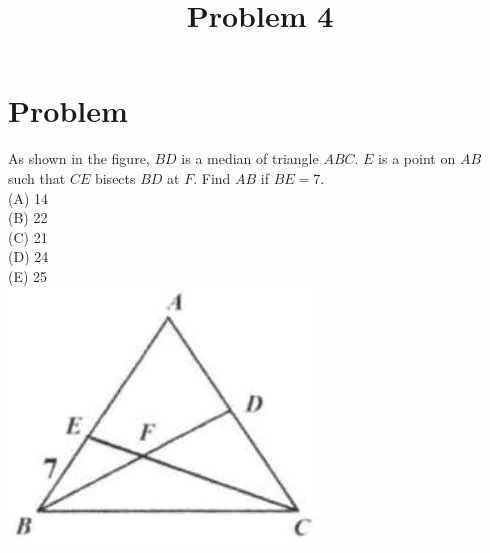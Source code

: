 \documentclass{article}
\title{Problem 4}
\date{}
\begin{document}
\maketitle

\section*{Problem}
As shown in the figure, \(B D\) is a median of triangle \(A B C\). \(E\) is a point on \(A B\) such that \(C E\) bisects \(B D\) at \(F\). Find \(A B\) if \(B E=7\).\\
(A) 14\\
(B) 22\\
(C) 21\\
(D) 24\\
(E) 25\\
\centering
\includegraphics[width=\textwidth]{images/126(1).jpg}
\end{document}

